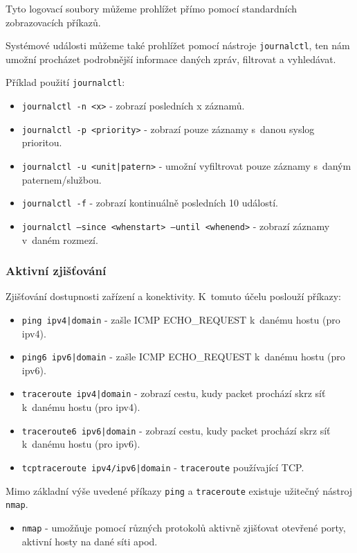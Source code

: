 Tyto logovací soubory můžeme prohlížet přímo pomocí standardních zobrazovacích příkazů.

Systémové události můžeme také prohlížet pomocí nástroje \texttt{journalctl}, ten nám umožní procházet podrobnější informace daných zpráv, filtrovat a vyhledávat.

Příklad použití \texttt{journalctl}:
\begin{itemize}
				\item \texttt{journalctl -n <x>} - zobrazí posledních x záznamů.
				\item \texttt{journalctl -p <priority>} - zobrazí pouze záznamy s~danou syslog prioritou.
				\item \texttt{journalctl -u <unit|patern>} - umožní vyfiltrovat pouze záznamy s~daným paternem/službou.
				\item \texttt{journalctl -f} - zobrazí kontinuálně posledních 10 událostí.
				\item \texttt{journalctl --since <whenstart> --until <whenend>} - zobrazí záznamy v~daném rozmezí.
\end{itemize}


\subsubsection{Aktivní zjišťování}
Zjišťování dostupnosti zařízení a konektivity. K~tomuto účelu poslouží příkazy:

\begin{itemize}
				\item \texttt{ping ipv4|domain} - zašle ICMP ECHO\_REQUEST k~danému hostu (pro ipv4).
				\item \texttt{ping6 ipv6|domain} - zašle ICMP ECHO\_REQUEST k~danému hostu (pro ipv6).
				\item \texttt{traceroute ipv4|domain} - zobrazí cestu, kudy packet prochází skrz síť k~danému hostu (pro ipv4).
				\item \texttt{traceroute6 ipv6|domain} - zobrazí cestu, kudy packet prochází skrz síť k~danému hostu (pro ipv6).
				\item \texttt{tcptraceroute ipv4/ipv6|domain} - \texttt{traceroute} používající TCP.
\end{itemize}

Mimo základní výše uvedené příkazy \texttt{ping} a \texttt{traceroute}
existuje užitečný nástroj \texttt{nmap}.

\begin{itemize}
				\item \texttt{nmap} - umožňuje pomocí různých protokolů aktivně zjišťovat otevřené porty, aktivní hosty na dané síti apod.
\end{itemize}


